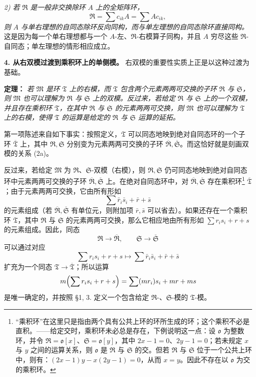 \documentclass[11pt]{article}
\providecommand{\frR}{\mathfrak R}
\providecommand{\frS}{\mathfrak S}
\providecommand{\frT}{\mathfrak T}
\providecommand{\frM}{\mathfrak M}
\providecommand{\frako}{\mathfrak o}
\begin{document}
\emph{2) 若 \(\frR\) 是一般非交换除环 \(A\) 上的全矩阵环，}
\[
        \frR=\sum c_{ik}A=\sum A c_{ik},
\]
\emph{则 \(A\) 与单右理想的自同态除环反向同构，而与单左理想的自同态除环直接同构。} 这是因为每一个单右理想都与一个 \(A\)-左、\(\frR\)-右模算子同构，并且 \(A\) 穷尽这些 \(\frR\)-自同态；单左理想的情形相应成立。

\noindent\textbf{4. 从右双模过渡到乘积环上的单侧模。} 右双模的重要性实质上正是以这种过渡为基础。

\noindent\textbf{定理：} \emph{若 \(\frM\) 是环 \(\frT\) 上的右模，而 \(\frT\) 包含两个元素两两可交换的子环 \(\frR\) 与 \(\frS\)，则 \(\frM\) 也可以理解为 \(\frR\) 与 \(\frS\) 上的双模。反过来，若给定 \(\frR\) 与 \(\frS\) 上的一个双模，并且存在乘积环 \(\frT\)，在其中 \(\frR\) 与 \(\frS\) 的元素两两可交换，则 \(\frM\) 也可以理解为 \(\frT\) 上的右模，使得 \(\frT\) 的运算是给定的 \(\frR\) 与 \(\frS\) 运算的延拓。}

第一项陈述来自如下事实：按照定义，\(\frT\) 可以同态地映到绝对自同态环的一个子环 \(\overline{\frT}\) 上，其中 \(\frR,\frS\) 分别变为元素两两可交换的子环 \(\overline{\frR},\overline{\frS}\)。而这恰好就是刻画双模的关系 (2a)。

反过来，若给定 \(\frM\) 为 \(\frR\)、\(\frS\)-双模（右模），则 \(\frR,\frS\) 仍可同态地映到绝对自同态环中元素两两可交换的子环 \(\overline{\frR},\overline{\frS}\) 上。在绝对自同态环中，对 \(\overline{\frR},\overline{\frS}\) 存在乘积环\footnote{“乘积环”在这里只是指由两个具有公共上环的环所生成的环；这个乘积不必是直积。——给定交时，乘积环未必总是存在，下例说明这一点：设 \(\frako\) 为整数环，并令 \(\frR=\frako[x]\)、\(\frS=\frako[y]\)，其中 \(2x-1=0\)、\(2y-1=0\)；若未规定 \(x\) 与 \(y\) 之间的运算关系，则 \(\frako\) 是 \(\frR\) 与 \(\frS\) 的交。但若 \(\frR\) 与 \(\frS\) 位于一个公共上环中，则有：\((2x-1)y-x(2y-1)=0\)，从而 \(x=y\)。因此不存在以 \(\frako\) 为交的乘积环。} \(\overline{\frT}\)；由于元素两两可交换，它由所有形如
\[
        \sum \bar r_i\bar s_i+\bar r+\bar s
\]
的元素组成（若 \(\overline{\frR},\overline{\frS}\) 有单位元，则附加项 \(\bar r,\bar s\) 可以省去）。如果还存在一个乘积环 \(\frT\)，其中 \(\frR\) 与 \(\frS\) 的元素两两可交换，那么它相应地由所有形如 \(\sum r_i s_i+r+s\) 的元素组成。因此，同态
\[
        \frR\to\overline{\frR},\qquad \frS\to\overline{\frS}
\]
可以通过对应
\[
        \sum r_i s_i+r+s
        \longmapsto
        \sum \bar r_i\bar s_i+\bar r+\bar s
\]
扩充为一个同态 \(\frT\to\overline{\frT}\)；所以运算
\[
        m\Bigl(\sum r_i s_i+r+s\Bigr)
        =\sum (m r_i)s_i+m r+m s
\]
是唯一确定的，并按照 §1, 3. 定义一个包含给定 \(\frR\)-、\(\frS\)-模的 \(\frT\)-模。
\end{document}

